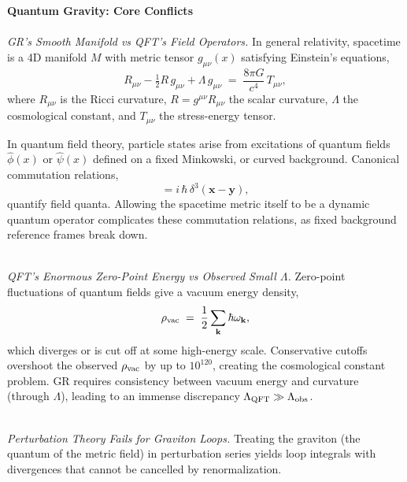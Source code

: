 
\begin{technical}
    {\Large\textbf{Quantum Gravity: Core Conflicts}}\\[0.3em]

    \\[0.25em]
    \textit{GR's Smooth Manifold vs QFT's Field Operators.}
    In general relativity, spacetime is a 4D manifold $M$ with metric tensor $g_{\mu\nu}(x)$ satisfying Einstein's equations,
    \begin{equation*}
        R_{\mu\nu} - \tfrac{1}{2}R\,g_{\mu\nu} + \Lambda\,g_{\mu\nu} \;=\; \frac{8\pi G}{c^4}\,T_{\mu\nu},
    \end{equation*}
    where $R_{\mu\nu}$ is the Ricci curvature, $R = g^{\mu\nu}R_{\mu\nu}$ the scalar curvature, $\Lambda$ the cosmological constant, and $T_{\mu\nu}$ the stress-energy tensor. 

    In quantum field theory, particle states arise from excitations of quantum fields $\hat{\phi}(x)$ or $\hat{\psi}(x)$ defined on a fixed Minkowski, or curved background. Canonical commutation relations,
    \begin{equation*}
        [\hat{\phi}(t,\mathbf{x}),\,\hat{\pi}(t,\mathbf{y})] = i\,\hbar\,\delta^3(\mathbf{x}-\mathbf{y}),
    \end{equation*}
    quantify field quanta. Allowing the spacetime metric itself to be a dynamic quantum operator complicates these commutation relations, as fixed background reference frames break down.

    \\[0.25em]
    \textit{QFT's Enormous Zero-Point Energy vs Observed Small $\Lambda$.}
    Zero-point fluctuations of quantum fields give a vacuum energy density,
    \begin{equation*}
        \rho_{\rm vac} \;=\; \frac{1}{2}\sum_{\mathbf{k}}\hbar\omega_{\mathbf{k}},
    \end{equation*}
    which diverges or is cut off at some high-energy scale. Conservative cutoffs overshoot the observed $\rho_{\rm vac}$ by up to $10^{120}$, creating the cosmological constant problem. GR requires consistency between vacuum energy and curvature (through $\Lambda$), leading to an immense discrepancy $\Lambda_{\rm QFT} \gg \Lambda_{\rm obs}$.

    \\[0.25em]
    \textit{Perturbation Theory Fails for Graviton Loops.}
    Treating the graviton (the quantum of the metric field) in perturbation series yields loop integrals with divergences that cannot be cancelled by renormalization.
    

\end{technical}

